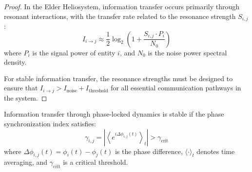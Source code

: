 \begin{proof}
In the Elder Heliosystem, information transfer occurs primarily through resonant interactions, with the transfer rate related to the resonance strength $S_{i,j}$:
\begin{equation}
I_{i \to j} \approx \frac{1}{2} \log_2 \left(1 + \frac{S_{i,j} \cdot P_i}{N_0}\right)
\end{equation}
where $P_i$ is the signal power of entity $i$, and $N_0$ is the noise power spectral density.

For stable information transfer, the resonance strengths must be designed to ensure that $I_{i \to j} > I_{\text{noise}} + I_{\text{threshold}}$ for all essential communication pathways in the system.
\end{proof}

\begin{theorem}
Information transfer through phase-locked dynamics is stable if the phase synchronization index satisfies:
\begin{equation}
\gamma_{i,j} = \left|\left\langle e^{i\Delta\phi_{i,j}(t)}\right\rangle_t\right| > \gamma_{\text{crit}}
\end{equation}
where $\Delta\phi_{i,j}(t) = \phi_i(t) - \phi_j(t)$ is the phase difference, $\langle \cdot \rangle_t$ denotes time averaging, and $\gamma_{\text{crit}}$ is a critical threshold.
\end{theorem}

